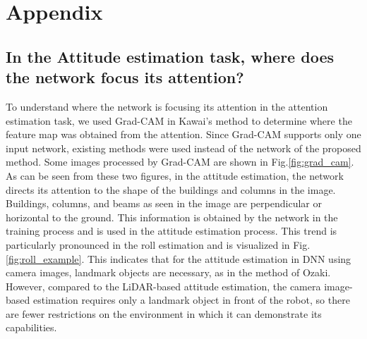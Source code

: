 
\section{Appendix}\label{sec:appendix}
\begin{comment}
\subsection{MAE of Attitude Estimation}
The results of inference are presented in Sec.\ref{sec:result} as Tab.\ref{tab:MAE_of_Error}. In this section, we present a scatterplot in Fig.\ref{fig:MAE_scatter} showing the error between the networks that performed well in the proposed method and the inference results of the comparison method. As shown in Fig.\ref{fig:MAE_scatter} and Fig.\ref{fig:MAE_scatter_unknown}, the points showing the inference results of the proposed method using the depth image are concentrated near the origin. This indicates that the use of the depth image is effective in attitude estimation. Fig.\ref{fig:MAE_scatter_unknown}, which shows the estimation results in an unknown environment, shows that the network with SA-Gate has the best accuracy in the estimation of roll. On the other hand, the network without SA-Gate was more accurate in pitch estimation.
\end{comment}

\subsection{In the Attitude estimation task, where does the network focus its attention?}
To understand where the network is focusing its attention in the attention estimation task, we used Grad-CAM\cite{Grad-CAM} in Kawai's method\cite{9708864} to determine where the feature map was obtained from the attention. Since Grad-CAM supports only one input network, existing methods were used instead of the network of the proposed method. Some images processed by Grad-CAM are shown in Fig.\ref{fig:grad_cam}. As can be seen from these two figures, in the attitude estimation, the network directs its attention to the shape of the buildings and columns in the image. Buildings, columns, and beams as seen in the image are perpendicular or horizontal to the ground. This information is obtained by the network in the training process and is used in the attitude estimation process. This trend is particularly pronounced in the roll estimation and is visualized in Fig.\ref{fig:roll_example}. This indicates that for the attitude estimation in DNN using camera images, landmark objects are necessary, as in the method of Ozaki\cite{ozaki_lidar_normal}. However, compared to the LiDAR-based attitude estimation, the camera image-based estimation requires only a landmark object in front of the robot, so there are fewer restrictions on the environment in which it can demonstrate its capabilities.





